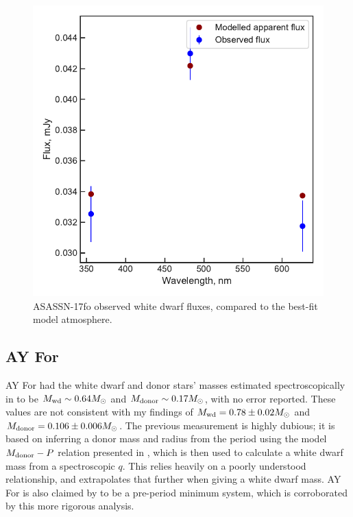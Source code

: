 \begin{figure}
    \centering
    \includegraphics[width=\textwidth]{figures/results/ASASSN-17fo/fluxplot.pdf}
    \caption{ASASSN-17fo observed white dwarf fluxes, compared to the best-fit model atmosphere.}
    \label{fig:ASASSN-17fo flux plot}
\end{figure}
\clearpage




\newpage
\subsection{AY For}

AY For had the white dwarf and donor stars' masses estimated spectroscopically in \citet{mason2005} to be $M_{\rm wd} \sim 0.64 M_\odot$ and $M_{\rm donor} \sim 0.17 M_\odot$, with no error reported.
These values are not consistent with my findings of $M_{\rm wd} = 0.78\pm0.02 M_\odot$ and $M_{\rm donor} = 0.106\pm0.006 M_\odot$.
The previous measurement is highly dubious; it is based on inferring a donor mass and radius from the period using the model $M_{\rm donor} - P$ relation presented in \citet{howell2002}, which is then used to calculate a white dwarf mass from a spectroscopic $q$. This relies heavily on a poorly understood relationship, and extrapolates that further when giving a white dwarf mass.
AY For is also claimed by \citet{mason2005} to be a pre-period minimum system, which is corroborated by this more rigorous analysis.

